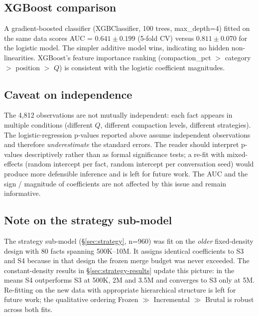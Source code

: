 \subsection{XGBoost comparison}
\label{sec:xgboost}

A gradient-boosted classifier (XGBClassifier, 100 trees, max\_depth=4)
fitted on the same data scores AUC = $0.641 \pm 0.199$ (5-fold CV) versus
$0.811 \pm 0.070$ for the logistic model. The simpler additive model wins,
indicating no hidden non-linearities. XGBoost's feature importance ranking
(compaction\_pct $>$ category $>$ position $>$ $Q$) is consistent with the logistic
coefficient magnitudes.

\subsection{Caveat on independence}
\label{sec:independence}

The 4{,}812 observations are not mutually independent: each fact appears in
multiple conditions (different $Q$, different compaction levels, different
strategies). The logistic-regression p-values reported above assume
independent observations and therefore \textit{underestimate} the standard
errors. The reader should interpret p-values descriptively rather than as
formal significance tests; a re-fit with mixed-effects (random intercept
per fact, random intercept per conversation seed) would produce more
defensible inference and is left for future work. The AUC and the sign /
magnitude of coefficients are not affected by this issue and remain
informative.

\subsection{Note on the strategy sub-model}
\label{sec:strategy-submodel}

The strategy sub-model (\S\ref{sec:strategy}, n=960) was fit on the \textit{older} fixed-density
design with 80 facts spanning 500K--10M. It assigns identical coefficients
to S3 and S4 because in that design the frozen merge budget was never
exceeded. The constant-density results in \S\ref{sec:strategy-results} update this picture: in the
means S4 outperforms S3 at 500K, 2M and 3.5M and converges to S3 only at
5M. Re-fitting on the new data with appropriate hierarchical structure is
left for future work; the qualitative ordering Frozen $\gg$ Incremental $\gg$
Brutal is robust across both fits.
